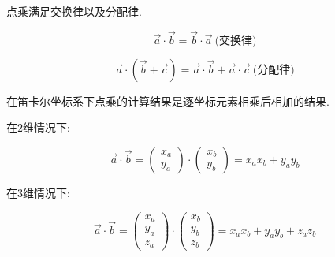 点乘满足交换律以及分配律. 

\begin{equation}
	\overrightarrow{a} \cdot \overrightarrow{b} = \overrightarrow{b} \cdot \overrightarrow{a}\ \text{(交换律)}
\end{equation}


\begin{equation}
	\overrightarrow{a} \cdot (\overrightarrow{b}+\overrightarrow{c}) = \overrightarrow{a} \cdot \overrightarrow{b}+\overrightarrow{a} \cdot \overrightarrow{c}\ \text{(分配律)}
\end{equation}

在笛卡尔坐标系下点乘的计算结果是逐坐标元素相乘后相加的结果. 

在$2$维情况下: 

\begin{equation}
	\overrightarrow{a} \cdot \overrightarrow{b} = \begin{pmatrix}
		x_a\\ 
		y_a
	\end{pmatrix}\cdot
	\begin{pmatrix}
		x_b\\ 
		y_b
	\end{pmatrix}
	=x_ax_b+y_ay_b
\end{equation}

在$3$维情况下: 

\begin{equation}
	\overrightarrow{a} \cdot \overrightarrow{b} = \begin{pmatrix}
		x_a\\ 
		y_a\\
		z_a
	\end{pmatrix}\cdot
	\begin{pmatrix}
		x_b\\ 
		y_b\\
		z_b
	\end{pmatrix}
	=x_ax_b+y_ay_b+z_az_b 
\end{equation}

